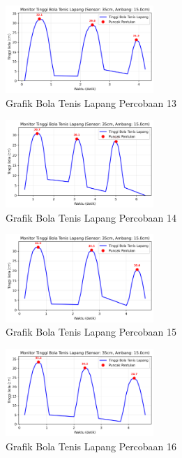\begin{figure}[htbp]
    \centering
    \includegraphics[width=0.5\textwidth]{chapters/DataPercobaan/Grafik_Bola_Tenis_Lapang_13.png}
    \caption{Grafik Bola Tenis Lapang Percobaan 13}
\end{figure}
\begin{figure}[htbp]
    \centering
    \includegraphics[width=0.5\textwidth]{chapters/DataPercobaan/Grafik_Bola_Tenis_Lapang_14.png}
    \caption{Grafik Bola Tenis Lapang Percobaan 14}
\end{figure}
\begin{figure}[htbp]
    \centering
    \includegraphics[width=0.5\textwidth]{chapters/DataPercobaan/Grafik_Bola_Tenis_Lapang_15.png}
    \caption{Grafik Bola Tenis Lapang Percobaan 15}
\end{figure}
\begin{figure}[htbp]
    \centering
    \includegraphics[width=0.5\textwidth]{chapters/DataPercobaan/Grafik_Bola_Tenis_Lapang_16.png}
    \caption{Grafik Bola Tenis Lapang Percobaan 16}
\end{figure}
